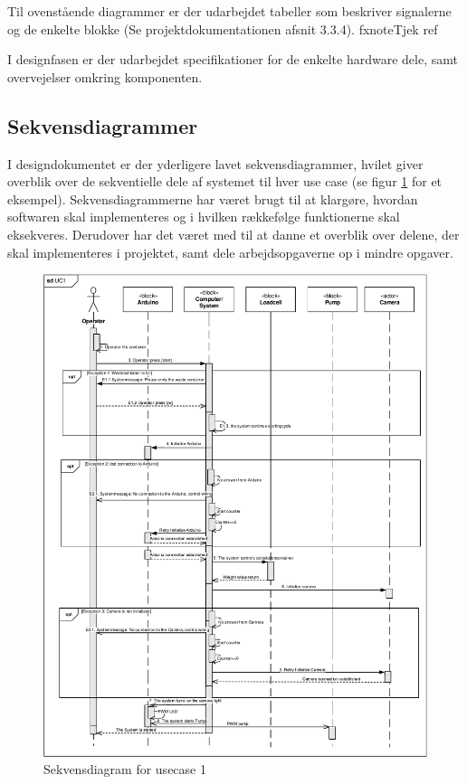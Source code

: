 Til ovenstående diagrammer er der udarbejdet tabeller som beskriver signalerne og de enkelte blokke (Se projektdokumentationen afsnit 3.3.4). fxnote{Tjek ref}

I designfasen er der udarbejdet specifikationer for de enkelte hardware dele, samt overvejelser omkring komponenten. 
\newpage
\subsection{Sekvensdiagrammer}
I designdokumentet er der yderligere lavet sekvensdiagrammer, hvilet giver overblik over de sekventielle dele af systemet til hver use case (se figur \ref{fig:sekvendisgr} for et eksempel). Sekvensdiagrammerne har været brugt til at klargøre, hvordan softwaren skal implementeres og i hvilken rækkefølge funktionerne skal eksekveres. Derudover har det været med til at danne et overblik over delene, der skal implementeres i projektet, samt dele arbejdsopgaverne op i mindre opgaver.
\begin{figure}[H]
	\centering
	\includegraphics[width=1\textwidth]{pdf/UC1_cropped.pdf}
	\caption{Sekvensdiagram for usecase 1}
	\label{fig:sekvendisgr}
\end{figure}


